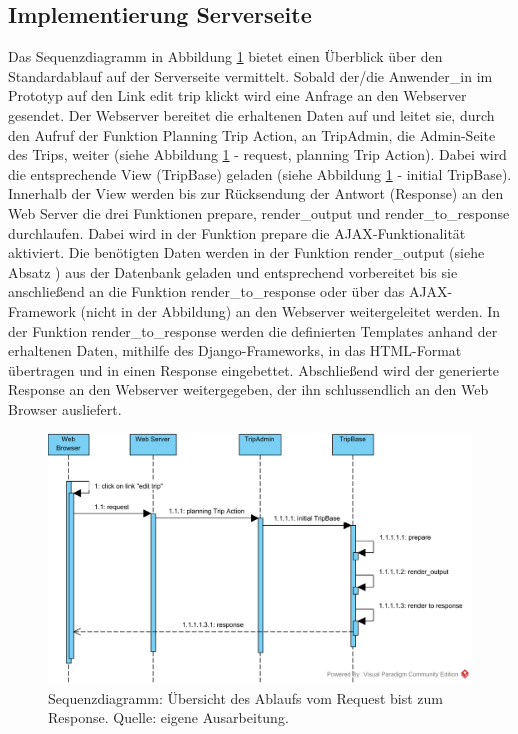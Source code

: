 \documentclass[Bachelorarbeit.tex]{subfiles}
\begin{document}
\subsection{Implementierung Serverseite}
\label{implServer}


Das Sequenzdiagramm in Abbildung \ref{fig:Overview} bietet einen Überblick über den Standardablauf auf der Serverseite vermittelt. 
Sobald der/die Anwender\_in im  Prototyp auf den Link edit trip klickt wird eine  Anfrage an den Webserver gesendet.
Der Webserver bereitet die erhaltenen Daten auf und leitet sie, durch den Aufruf der Funktion Planning Trip Action, an TripAdmin, die Admin-Seite des Trips, weiter (siehe Abbildung \ref{fig:Overview} - request, planning Trip Action). 
Dabei wird die entsprechende View (TripBase) geladen (siehe Abbildung \ref{fig:Overview} - initial TripBase).
Innerhalb der View werden bis zur Rücksendung der Antwort (Response) an den Web Server die drei Funktionen prepare, render\_output und render\_to\_response durchlaufen. 
Dabei wird in der Funktion prepare die \ac{AJAX}-Funktionalität aktiviert.
Die benötigten Daten werden in der Funktion render\_output (siehe Absatz ) aus der Datenbank geladen und entsprechend vorbereitet bis sie anschließend an die Funktion render\_to\_response oder über das \ac{AJAX}-Framework (nicht in der Abbildung) an den Webserver weitergeleitet werden.
In der Funktion render\_to\_response werden die definierten Templates anhand der erhaltenen Daten, mithilfe des Django-Frameworks, in das \ac{HTML}-Format übertragen und in einen Response eingebettet.
Abschließend wird der generierte Response an den Webserver weitergegeben, der ihn schlussendlich an den Web Browser ausliefert.


\begin{figure}[h]
\centering
\includegraphics[width=1\linewidth]{img/Implementierung/Overview}
\caption[k]{Sequenzdiagramm: Übersicht des Ablaufs vom Request bist zum Response. Quelle: eigene Ausarbeitung.}
\label{fig:Overview}
\end{figure}
\end{document}
